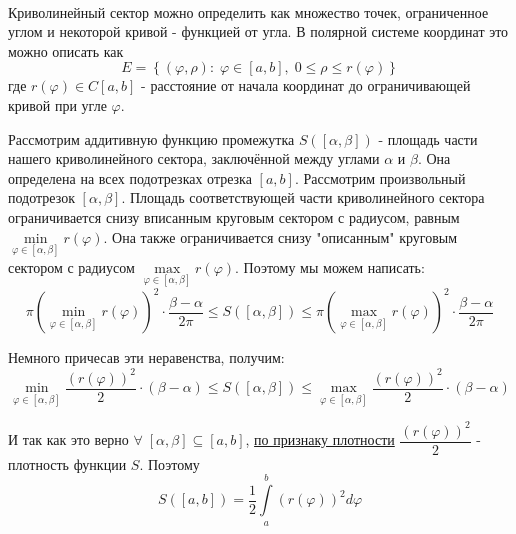 \documentclass[../main.tex]{subfiles}
\begin{document}
\begin{example}
    
    ~

    Криволинейный сектор можно определить как множество точек, ограниченное углом и некоторой кривой - функцией от угла. В полярной системе координат это можно описать как 
    \[ E=\left\{ \left( \varphi , \rho\right): \; \varphi \in \left[ a , b \right],\; 0 \leq \rho \leq r\left( \varphi \right)\right\}\]
    где \( r\left( \varphi \right) \in C\left[ a , b \right]\) - расстояние от начала координат до ограничивающей кривой при угле \( \varphi \).


    Рассмотрим аддитивную функцию промежутка \( S(\left[ \alpha , \beta \right])\) - площадь части нашего криволинейного сектора, заключённой между 
    углами \( \alpha \) и \( \beta \). Она определена на всех подотрезках отрезка \( \left[ a,b\right]\). Рассмотрим произвольный подотрезок \( \left[ \alpha , \beta \right]\).
    Площадь соответствующей части криволинейного сектора ограничивается снизу вписанным круговым сектором с радиусом, равным \( \min\limits_{ \varphi \in \left[ \alpha , \beta \right]} r\left( \varphi \right)\). 
    Она также ограничивается снизу "описанным" круговым сектором с радиусом \( \max\limits_{ \varphi \in \left[ \alpha , \beta \right]} r\left( \varphi \right)\). Поэтому мы можем написать:
    \[ \pi \left( \min\limits_{ \varphi \in \left[ \alpha , \beta \right]} r\left( \varphi \right) \right)^2\cdot \dfrac{ \beta-\alpha}{ 2 \pi } \leq S(\left[ \alpha , \beta \right]) \leq \pi \left( \max\limits_{ \varphi \in \left[ \alpha , \beta \right]} r\left( \varphi \right) \right)^2\cdot \dfrac{ \beta-\alpha}{ 2 \pi }\]

    Немного причесав эти неравенства, получим:
    \[ \min\limits_{ \varphi \in \left[ \alpha , \beta \right]} \dfrac{ (r\left(\varphi\right))^2}{ 2}\cdot \left( \beta - \alpha \right) \leq S(\left[ \alpha , \beta \right]) \leq \max\limits_{ \varphi \in \left[ \alpha , \beta \right]} \dfrac{ (r\left(\varphi\right))^2}{ 2}\cdot \left( \beta - \alpha \right)\]

    И так как это верно \( \forall \; \left[ \alpha , \beta \right] \subseteq  \left[ a,b\right]\), \hyperlink{thm:density}{по признаку плотности} \( \dfrac{ (r\left(\varphi\right))^2}{ 2}\) - плотность функции \( S\). Поэтому
    \[ \boxed{ S\left( \left[ a,b\right]\right)= \dfrac{ 1}{ 2}\displaystyle\int\limits_{ a}^{ b}\left( r\left( \varphi \right)\right)^2d \varphi }\]
\end{example}
\end{document}

